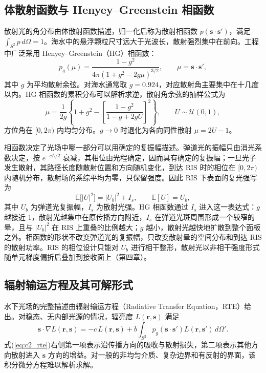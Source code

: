 \subsection{体散射函数与 Henyey--Greenstein 相函数}

散射光的角分布由体散射函数描述，归一化后称为散射相函数 $p(\mathbf s\cdot\mathbf s')$，满足 $\int_{S^2}p\,d\Omega=1$。海水中的悬浮颗粒尺寸远大于光波长，散射强烈集中在前向。工程中广泛采用 Henyey--Greenstein（HG）相函数：
\begin{equation}
p_g(\mu)=\frac{1-g^2}{4\pi\left(1+g^2-2g\mu\right)^{3/2}},\qquad \mu=\mathbf s\cdot\mathbf s',
\label{eq:c2_hg}
\end{equation}
其中 $g$ 为平均散射余弦。对海水通常取 $g=0.924$，对应散射角主要集中在十几度以内。HG 相函数的累积分布可以解析求逆，散射角余弦的抽样公式为
\begin{equation}
\mu=\frac{1}{2g}\left\{1+g^2-\left[\frac{1-g^2}{1-g+2gU}\right]^2\right\},\qquad U\sim\mathcal U(0,1),
\label{eq:c2_hg_sample}
\end{equation}
方位角在 $[0,2\pi)$ 内均匀分布。$g\to0$ 时退化为各向同性散射 $\mu=2U-1$。

相函数决定了光场中哪一部分可以用确定的复振幅描述。弹道光的振幅只由消光系数决定，按 $e^{-cL/2}$ 衰减，其相位由光程确定，因而具有确定的复振幅；一旦光子发生散射，其路径长度随散射位置和方向随机变化，到达 RIS 时的相位在 $[0,2\pi)$ 内随机分布，散射场的系综平均为零，只保留强度。因此 RIS 下表面的复光强写为
\begin{equation}
\mathbb E\big[|U|^2\big]=|U_b|^2+I_s,\qquad \mathbb E[U]=U_b,
\label{eq:c2_coherent_split}
\end{equation}
其中 $U_b$ 为弹道光复振幅，$I_s$ 为散射光强。HG 相函数通过 $I_s$ 进入这一表达式：$g$ 越接近 1，散射光越集中在原传播方向附近，$I_s$ 在弹道光斑周围形成一个较窄的晕，且与 $|U_b|^2$ 在 RIS 上重叠的比例越大；$g$ 越小，散射光越快地扩散到整个面板之外。相函数的形状不改变弹道光的复振幅，只改变散射晕的空间分布和到达 RIS 的散射功率。RIS 的相位设计只能对 $U_b$ 进行相干整形，散射光以非相干强度形式随单元梯度偏折后叠加到接收面上（第四章）。

\subsection{辐射输运方程及其可解形式}
\label{sec:c2_rte}

水下光场的完整描述由辐射输运方程（Radiative Transfer Equation，RTE）给出。对稳态、无内部光源的情况，辐亮度 $L(\mathbf r,\mathbf s)$ 满足
\begin{equation}
\mathbf s\cdot\nabla L(\mathbf r,\mathbf s)=-c\,L(\mathbf r,\mathbf s)+b\int_{S^2}p_g(\mathbf s\cdot\mathbf s')L(\mathbf r,\mathbf s')\,d\Omega'.
\label{eq:c2_rte}
\end{equation}
式(\ref{eq:c2_rte})右侧第一项表示沿传播方向的吸收与散射损失，第二项表示其他方向散射进入 $\mathbf s$ 方向的增益。对一般的非均匀介质、复杂边界和有反射的界面，该积分微分方程难以解析求解。

